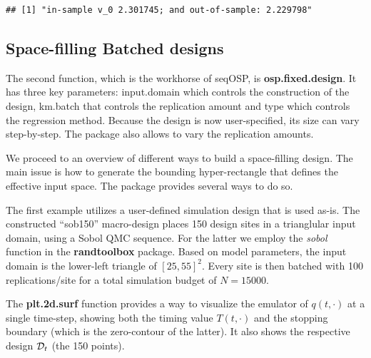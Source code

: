 \documentclass[]{article}
\begin{document}
\begin{verbatim}
## [1] "in-sample v_0 2.301745; and out-of-sample: 2.229798"
\end{verbatim}

\subsection{Space-filling Batched
designs}\label{space-filling-batched-designs}

The second function, which is the workhorse of seqOSP, is
\textbf{osp.fixed.design}. It has three key parameters: input.domain
which controls the construction of the design, km.batch that controls
the replication amount and type which controls the regression method.
Because the design is now user-specified, its size can vary
step-by-step. The package also allows to vary the replication amounts.

We proceed to an overview of different ways to build a space-filling
design. The main issue is how to generate the bounding hyper-rectangle
that defines the effective input space. The package provides several
ways to do so.

The first example utilizes a user-defined simulation design that is used
as-is. The constructed ``sob150'' macro-design places 150 design sites
in a trianglular input domain, using a Sobol QMC sequence. For the
latter we employ the \emph{sobol} function in the \textbf{randtoolbox}
package. Based on model parameters, the input domain is the lower-left
triangle of \([25,55]^2\). Every site is then batched with 100
replications/site for a total simulation budget of \(N=15000\).

The \textbf{plt.2d.surf} function provides a way to visualize the
emulator of \(q(t,\cdot)\) at a single time-step, showing both the
timing value \(T(t,\cdot)\) and the stopping boundary (which is the
zero-contour of the latter). It also shows the respective design
\({\cal D}_t\) (the 150 points).
\end{document}
